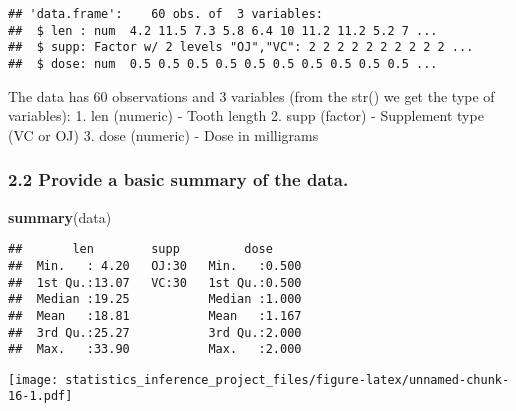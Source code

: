 \documentclass[]{article}
\newenvironment{Shaded}{\begin{snugshade}}{\end{snugshade}}
\newcommand{\KeywordTok}[1]{\textcolor[rgb]{0.13,0.29,0.53}{\textbf{#1}}}
\newcommand{\DataTypeTok}[1]{\textcolor[rgb]{0.13,0.29,0.53}{#1}}
\newcommand{\StringTok}[1]{\textcolor[rgb]{0.31,0.60,0.02}{#1}}
\newcommand{\OperatorTok}[1]{\textcolor[rgb]{0.81,0.36,0.00}{\textbf{#1}}}
\newcommand{\NormalTok}[1]{#1}
\begin{document}
\begin{verbatim}
## 'data.frame':    60 obs. of  3 variables:
##  $ len : num  4.2 11.5 7.3 5.8 6.4 10 11.2 11.2 5.2 7 ...
##  $ supp: Factor w/ 2 levels "OJ","VC": 2 2 2 2 2 2 2 2 2 2 ...
##  $ dose: num  0.5 0.5 0.5 0.5 0.5 0.5 0.5 0.5 0.5 0.5 ...
\end{verbatim}

The data has 60 observations and 3 variables (from the str() we get the
type of variables): 1. len (numeric) - Tooth length 2. supp (factor) -
Supplement type (VC or OJ) 3. dose (numeric) - Dose in milligrams

\subsubsection{2.2 Provide a basic summary of the
data.}\label{provide-a-basic-summary-of-the-data.}

\begin{Shaded}
\begin{Highlighting}[]
\KeywordTok{summary}\NormalTok{(data)}
\end{Highlighting}
\end{Shaded}

\begin{verbatim}
##       len        supp         dose      
##  Min.   : 4.20   OJ:30   Min.   :0.500  
##  1st Qu.:13.07   VC:30   1st Qu.:0.500  
##  Median :19.25           Median :1.000  
##  Mean   :18.81           Mean   :1.167  
##  3rd Qu.:25.27           3rd Qu.:2.000  
##  Max.   :33.90           Max.   :2.000
\end{verbatim}

\begin{Shaded}
\end{Shaded}

\texttt{[image: statistics\_inference\_project\_files/figure-latex/unnamed-chunk-16-1.pdf]}

\begin{Shaded}
\end{Shaded}
\end{document}
